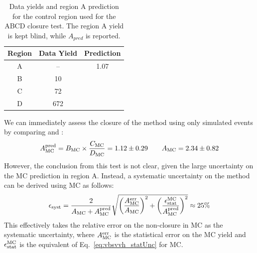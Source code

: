 \begin{table}[htbp]
    \centering
    \caption[VBS $\VVH$ ABCD yields]{
        Data yields and region A prediction for the control region used for the ABCD closure test. 
        The region A yield is kept blind, while $A_{pred}$ is reported.
    }
    \begin{tabular}{ccc}
    \toprule
    \textbf{Region} & Data Yield & Prediction \\
    \midrule
    A               & --         & 1.07       \\
    B               & 10         &            \\
    C               & 72         &            \\
    D               & 672        &            \\
    \bottomrule
    \end{tabular}
    \label{tab:0lepABCDregion}
\end{table}

We can immediately assess the closure of the method using only simulated events by comparing \AMCPred and \AMC:
\begin{equation*}
    A_{\mathrm{MC}}^{\text{pred}} = B_{\mathrm{MC}}\times\frac{C_{\mathrm{MC}}}{D_{\mathrm{MC}}} = 1.12\pm0.29 \qquad A_{\mathrm{MC}} = 2.34\pm0.82
\end{equation*}
However, the conclusion from this test is not clear, given the large uncertainty on the MC prediction in region A. 
Instead, a systematic uncertainty on the method \Esyst can be derived using MC as follows:
\begin{equation}
    \epsilon_{\text{syst}} = 
        \frac{2}{A_{\mathrm{MC}} + A_{\mathrm{MC}}^{\text{pred}}}
        \sqrt{\bigg(\frac{A_{\mathrm{MC}}^\text{err}}{A_{\mathrm{MC}}}\bigg)^2 + \bigg(\frac{\epsilon_{\text{stat}}^\mathrm{MC}}{A_{\mathrm{MC}}^{\text{pred}}}\bigg)^2} \approx 25\%
\end{equation}
This effectively takes the relative error on the non-closure in MC as the systematic uncertainty, where $A_{\mathrm{MC}}^\text{err}$ is the statistical error on the MC yield and $\epsilon_{\text{stat}}^\mathrm{MC}$ is the equivalent of Eq.~\ref{eq:vbsvvh_statUnc} for MC.

